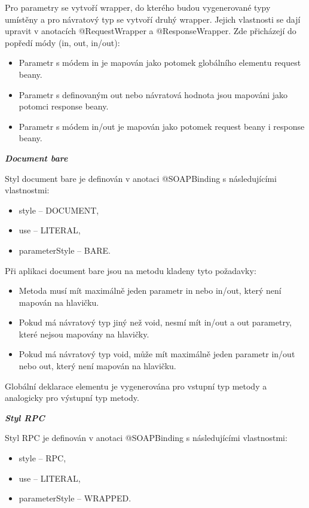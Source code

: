\documentclass[11pt,twoside,a4paper]{book}
\begin{document}
Pro parametry se vytvoří wrapper, do kterého budou vygenerované typy umístěny a pro
návratový typ se vytvoří druhý wrapper. Jejich vlastnosti se dají upravit v anotacích
@RequestWrapper a @ResponseWrapper. Zde přicházejí do popředí módy (in, out, in/out):

\begin{itemize}
  \item Parametr s módem in je mapován jako potomek globálního elementu request beany.
  \item Parametr s definovaným out nebo návratová hodnota jsou mapováni jako potomci
response beany.
  \item Parametr s módem in/out je mapován jako potomek request beany i response beany.
\end{itemize}

\textbf{\textit{Document bare}}

Styl document bare je definován v anotaci @SOAPBinding s následujícími vlastnostmi:

\begin{itemize}
  \item style – DOCUMENT,
  \item use – LITERAL,
  \item parameterStyle – BARE.
\end{itemize}

Při aplikaci document bare jsou na metodu kladeny tyto požadavky:

\begin{itemize}
  \item Metoda musí mít maximálně jeden parametr in nebo in/out, který není mapován na
hlavičku.
  \item Pokud má návratový typ jiný než void, nesmí mít in/out a out parametry, které nejsou
mapovány na hlavičky.
  \item Pokud má návratový typ void, může mít maximálně jeden parametr in/out
nebo out, který není mapován na hlavičku.
\end{itemize}

Globální deklarace elementu je vygenerována pro vstupní typ metody a analogicky pro
výstupní typ metody.

\textbf{\textit{Styl RPC}}

Styl RPC je definován v anotaci @SOAPBinding s následujícími vlastnostmi:

\begin{itemize}
  \item style – RPC,
  \item use – LITERAL,
  \item parameterStyle – WRAPPED.
\end{itemize}
\end{document}

